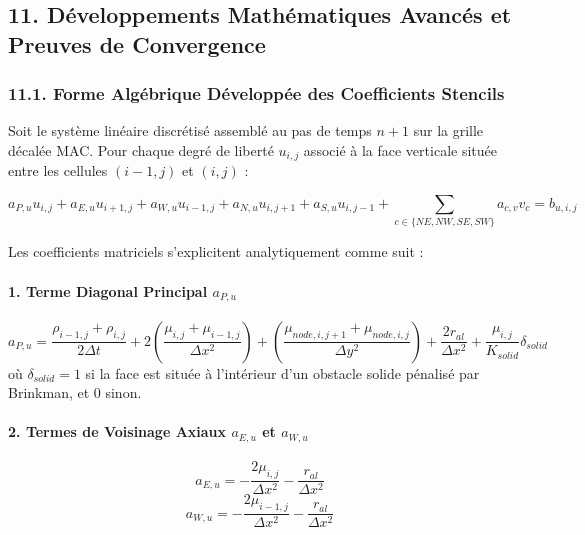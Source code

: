 \documentclass[
  french,
]{article}
\begin{document}
\subsection{11. Développements Mathématiques Avancés et Preuves de
Convergence}\label{duxe9veloppements-mathuxe9matiques-avancuxe9s-et-preuves-de-convergence}

\subsubsection{11.1. Forme Algébrique Développée des Coefficients
Stencils}\label{forme-alguxe9brique-duxe9veloppuxe9e-des-coefficients-stencils}

Soit le système linéaire discrétisé assemblé au pas de temps \(n+1\) sur
la grille décalée MAC. Pour chaque degré de liberté \(u_{i, j}\) associé
à la face verticale située entre les cellules \((i-1, j)\) et \((i, j)\)
:

\[a_{P, u} u_{i, j} + a_{E, u} u_{i+1, j} + a_{W, u} u_{i-1, j} + a_{N, u} u_{i, j+1} + a_{S, u} u_{i, j-1} + \sum_{c \in \{NE, NW, SE, SW\}} a_{c, v} v_c = b_{u, i, j}\]

Les coefficients matriciels s'explicitent analytiquement comme suit :

\paragraph{\texorpdfstring{1. Terme Diagonal Principal
\(a_{P, u}\)}{1. Terme Diagonal Principal a\_\{P, u\}}}\label{terme-diagonal-principal-a_p-u}

\[a_{P, u} = \frac{\rho_{i-1, j} + \rho_{i, j}}{2 \Delta t} + 2 \left( \frac{\mu_{i, j} + \mu_{i-1, j}}{\Delta x^2} \right) + \left( \frac{\mu_{node, i, j+1} + \mu_{node, i, j}}{\Delta y^2} \right) + \frac{2 r_{al}}{\Delta x^2} + \frac{\mu_{i, j}}{K_{solid}} \delta_{solid}\]
où \(\delta_{solid} = 1\) si la face est située à l'intérieur d'un
obstacle solide pénalisé par Brinkman, et \(0\) sinon.

\paragraph{\texorpdfstring{2. Termes de Voisinage Axiaux \(a_{E, u}\) et
\(a_{W, u}\)}{2. Termes de Voisinage Axiaux a\_\{E, u\} et a\_\{W, u\}}}\label{termes-de-voisinage-axiaux-a_e-u-et-a_w-u}

\[a_{E, u} = - \frac{2 \mu_{i, j}}{\Delta x^2} - \frac{r_{al}}{\Delta x^2}\]
\[a_{W, u} = - \frac{2 \mu_{i-1, j}}{\Delta x^2} - \frac{r_{al}}{\Delta x^2}\]
\end{document}
